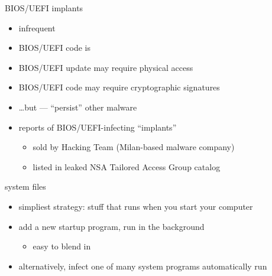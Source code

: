 \begin{frame}{BIOS/UEFI implants}
    \begin{itemize}
    \item infrequent
    \item BIOS/UEFI code is 
    \item BIOS/UEFI update may require physical access
    \item BIOS/UEFI code may require cryptographic signatures
    \item \ldots but  --- ``persist'' other malware
    \item reports of BIOS/UEFI-infecting ``implants''
        \begin{itemize}
        \item sold by Hacking Team (Milan-based malware company) 
        \item listed in leaked NSA Tailored Access Group catalog
        \end{itemize}
    \end{itemize}
\end{frame}


\begin{frame}{system files}
    \begin{itemize}
    \item simpliest strategy: stuff that runs when you start your computer
    \item add a new startup program, run in the background
        \begin{itemize}
        \item easy to blend in
        \end{itemize}
    \vspace{.5cm}
    \item alternatively, infect one of many system programs automatically run
    \end{itemize}

\end{frame}

